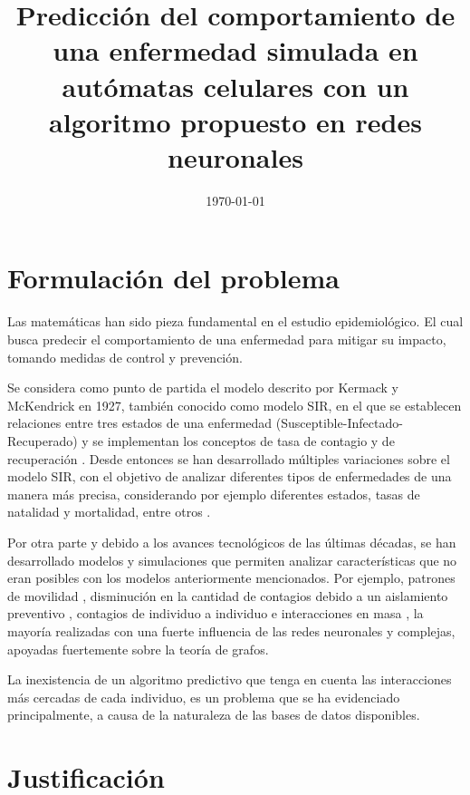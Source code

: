 \documentclass{article}
\title{Predicción del comportamiento de una enfermedad simulada en autómatas celulares con un algoritmo propuesto en redes neuronales}
\date{\today}
\begin{document}
\maketitle
\section{Formulación del problema}

Las matemáticas han sido pieza fundamental en el estudio epidemiológico. El cual busca predecir el comportamiento de una enfermedad para mitigar su impacto, tomando medidas de control y prevención. 

Se considera como punto de partida el modelo descrito por Kermack y McKendrick en 1927, también conocido como modelo SIR, en el que se establecen relaciones entre tres estados de una enfermedad (Susceptible-Infectado-Recuperado) y se implementan los conceptos de tasa de contagio y de recuperación \cite{malariaSIR}. Desde entonces se han desarrollado múltiples variaciones sobre el modelo SIR, con el objetivo de analizar diferentes tipos de enfermedades de una manera más precisa, considerando por ejemplo diferentes estados, tasas de natalidad y mortalidad, entre otros \cite{diego2010}.

Por otra parte y debido a los avances tecnológicos de las últimas décadas, se han desarrollado modelos y simulaciones que permiten analizar características que no eran posibles con los modelos anteriormente mencionados. Por ejemplo, patrones de movilidad \cite{colaGNN, epidemiologicalNeuralNetwork}, disminución en la cantidad de contagios debido a un aislamiento preventivo \cite{stayHome}, contagios de individuo a individuo \cite{heterogeneousPopulation} e interacciones en masa \cite{combiningGraph, transfer2021}, la mayoría realizadas con una fuerte influencia de las redes neuronales y complejas, apoyadas fuertemente sobre la teoría de grafos. 

La inexistencia de un algoritmo predictivo que tenga en cuenta las interacciones más cercadas de cada individuo, es un problema que se ha evidenciado principalmente, a causa de la naturaleza de las bases de datos disponibles.

\section{Justificación}
\end{document}
